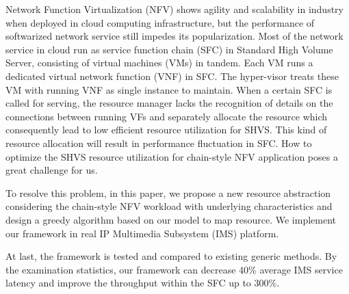 \begin{englishabstract}
Network Function Virtualization (NFV) shows agility and scalability in industry when deployed in cloud computing infrastructure, but the performance of softwarized network service still impedes its popularization. Most of the network service in cloud run as service function chain (SFC) in Standard High Volume Server, consisting of virtual machines (VMs) in tandem. Each VM runs a dedicated virtual network function (VNF) in SFC. The hyper-visor treats these VM with running VNF as single instance to maintain. When a certain SFC is called for serving, the resource manager lacks the recognition of details on the connections between running VFs and separately allocate the resource which consequently lead to low efficient resource utilization for SHVS. This kind of resource allocation will result in performance fluctuation in SFC. How to optimize the SHVS resource utilization for chain-style NFV application poses a great challenge for us.

To resolve this problem, in this paper, we propose a new resource abstraction considering the chain-style NFV workload with underlying characteristics and design a greedy algorithm based on our model to map resource. We implement our framework in real IP Multimedia Subsystem (IMS) platform. 

At last, the framework is tested and compared to existing generic methods. By the examination statistics, our framework can decrease 40\% average IMS service latency and improve the throughput within the SFC up to 300\%.

\end{englishabstract}

